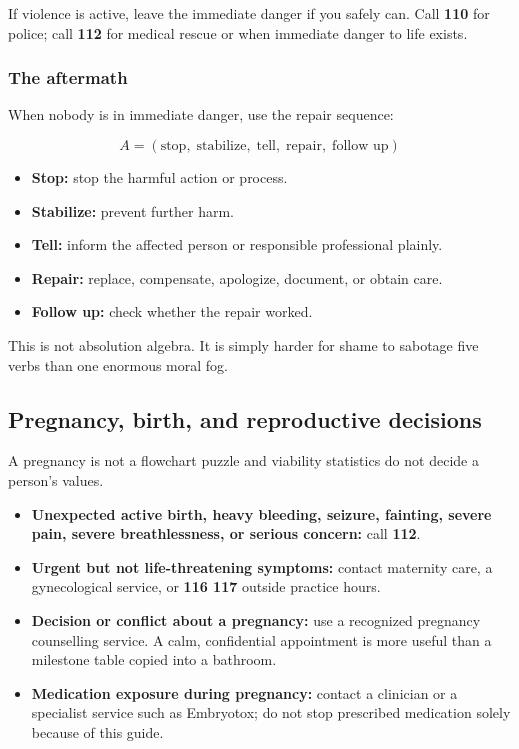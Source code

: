 If violence is active, leave the immediate danger if you safely can.
Call \textbf{110} for police; call \textbf{112} for medical rescue or
when immediate danger to life exists.

\hypertarget{the-aftermath}{%
\subsubsection{The aftermath}\label{the-aftermath}}

When nobody is in immediate danger, use the repair sequence:

\[A = (\text{stop},\; \text{stabilize},\; \text{tell},\; \text{repair},\; \text{follow up})\]

\begin{itemize}
\tightlist
\item
  \textbf{Stop:} stop the harmful action or process.
\item
  \textbf{Stabilize:} prevent further harm.
\item
  \textbf{Tell:} inform the affected person or responsible professional
  plainly.
\item
  \textbf{Repair:} replace, compensate, apologize, document, or obtain
  care.
\item
  \textbf{Follow up:} check whether the repair worked.
\end{itemize}

This is not absolution algebra. It is simply harder for shame to
sabotage five verbs than one enormous moral fog.

\hypertarget{pregnancy-birth-and-reproductive-decisions}{%
\subsection{Pregnancy, birth, and reproductive
decisions}\label{pregnancy-birth-and-reproductive-decisions}}

A pregnancy is not a flowchart puzzle and viability statistics do not
decide a person's values.

\begin{itemize}
\tightlist
\item
  \textbf{Unexpected active birth, heavy bleeding, seizure, fainting,
  severe pain, severe breathlessness, or serious concern:} call
  \textbf{112}.
\item
  \textbf{Urgent but not life-threatening symptoms:} contact maternity
  care, a gynecological service, or \textbf{116 117} outside practice
  hours.
\item
  \textbf{Decision or conflict about a pregnancy:} use a recognized
  pregnancy counselling service. A calm, confidential appointment is
  more useful than a milestone table copied into a bathroom.
\item
  \textbf{Medication exposure during pregnancy:} contact a clinician or
  a specialist service such as Embryotox; do not stop prescribed
  medication solely because of this guide.
\end{itemize}

